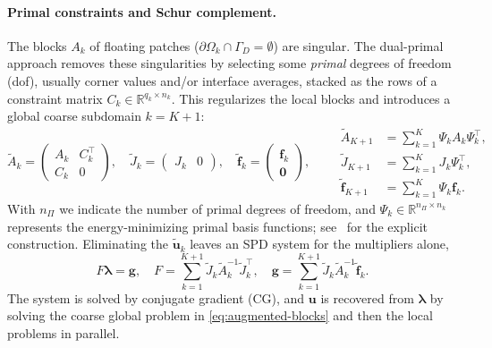 \documentclass{article}
\newcommand{\vect}[1]{\boldsymbol{#1}}
\newcommand{\R}{\mathbb{R}}
\newcommand{\npatch}{K} %
\newcommand{\patchdom}[1]{\Omega_{#1}}            %
\newcommand{\uglo}{\vect{u}}                      %
\newcommand{\Aloc}[1]{A_{#1}}                    %
\newcommand{\Aaug}[1]{\widetilde{A}_{#1}}        %
\newcommand{\floc}[1]{\vect{f}_{#1}}             %
\newcommand{\faug}[1]{\widetilde{\vect{f}}_{#1}} %
\newcommand{\Jloc}[1]{J_{#1}}                    %
\newcommand{\Jaug}[1]{\widetilde{J}_{#1}}        %
\newcommand{\Cloc}[1]{C_{#1}}                    %
\newcommand{\Psik}[1]{\Psi_{#1}}                 %
\newcommand{\nprim}{n_\Pi}                        %
\newcommand{\Fschur}{F}                           %
\newcommand{\gschur}{\vect{g}}                    %
\newcommand{\uaug}[1]{\widetilde{\vect{u}}_{#1}} %
\newcommand{\lagmult}{\vect{\lambda}}             %
\theoremstyle{plain}
\numberwithin{equation}{section}
\begin{document}
\paragraph{Primal constraints and Schur complement.}
The blocks $\Aloc{k}$ of floating patches ($\partial\patchdom{k} \cap \Gamma_D =
    \emptyset$) are singular. The dual-primal approach removes these singularities by selecting some \emph{primal}
degrees of freedom (dof), usually corner values and/or interface averages, stacked as the
rows of a constraint matrix $\Cloc{k} \in \R^{q_k \times n_k}$.
This regularizes the local blocks and introduces a global
coarse subdomain $k = \npatch + 1$:
\begin{equation}
    \Aaug{k} =
    \begin{pmatrix} \Aloc{k} & \Cloc{k}^{\top} \\ \Cloc{k} & 0 \end{pmatrix},
    \quad
    \Jaug{k} = \begin{pmatrix} \Jloc{k} & 0 \end{pmatrix},
    \quad
    \faug{k} = \begin{pmatrix} \floc{k} \\ \vect{0} \end{pmatrix},
    \qquad
    \begin{aligned}
        \Aaug{\npatch+1} & = \textstyle\sum_{k=1}^{\npatch} \Psik{k} \Aloc{k} \Psik{k}^{\top}, \\
        \Jaug{\npatch+1} & = \textstyle\sum_{k=1}^{\npatch} \Jloc{k} \Psik{k}^{\top},          \\
        \faug{\npatch+1} & = \textstyle\sum_{k=1}^{\npatch} \Psik{k} \floc{k}.
    \end{aligned}
    \label{eq:augmented-blocks}
\end{equation}
With $\nprim$ we indicate the number of primal degrees of freedom, and $\Psik{k} \in
    \R^{\nprim \times n_k}$ represents the energy-minimizing primal basis functions;
see~\cite{kleiss2012ieti} for the explicit construction. Eliminating the
$\uaug{k}$ leaves an SPD system for the multipliers alone,
\begin{equation}
    \Fschur \lagmult = \gschur,
    \quad
    \Fschur = \sum_{k=1}^{\npatch+1} \Jaug{k} \Aaug{k}^{-1}
    \Jaug{k}^{\top},
    \quad
    \gschur = \sum_{k=1}^{\npatch+1} \Jaug{k} \Aaug{k}^{-1}
    \faug{k}.
    \label{eq:ieti-schur}
\end{equation}
The system is solved by conjugate gradient (CG), and $\uglo$ is
recovered from $\lagmult$ by solving the coarse global problem in \eqref{eq:augmented-blocks}
and then the local problems in parallel.
\end{document}
